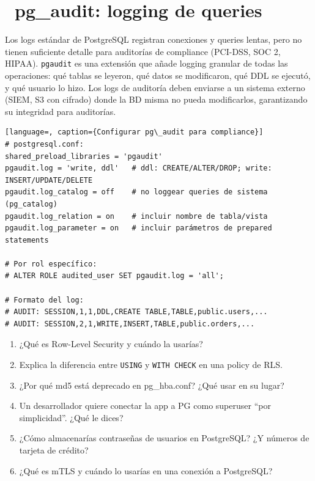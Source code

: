 \section[pg\_audit: logging de queries]{~pg\_audit: logging de queries}

Los logs estándar de PostgreSQL registran conexiones y queries lentas, pero no tienen suficiente detalle para auditorías de compliance (PCI-DSS, SOC 2, HIPAA).
\texttt{pgaudit} es una extensión que añade logging granular de todas las operaciones: qué tablas se leyeron, qué datos se modificaron, qué DDL se ejecutó, y qué usuario lo hizo.
Los logs de auditoría deben enviarse a un sistema externo (SIEM, S3 con cifrado) donde la BD misma no pueda modificarlos, garantizando su integridad para auditorías.

\begin{lstlisting}[language=, caption={Configurar pg\_audit para compliance}]
# postgresql.conf:
shared_preload_libraries = 'pgaudit'
pgaudit.log = 'write, ddl'   # ddl: CREATE/ALTER/DROP; write: INSERT/UPDATE/DELETE
pgaudit.log_catalog = off    # no loggear queries de sistema (pg_catalog)
pgaudit.log_relation = on    # incluir nombre de tabla/vista
pgaudit.log_parameter = on   # incluir parámetros de prepared statements

# Por rol específico:
# ALTER ROLE audited_user SET pgaudit.log = 'all';

# Formato del log:
# AUDIT: SESSION,1,1,DDL,CREATE TABLE,TABLE,public.users,...
# AUDIT: SESSION,2,1,WRITE,INSERT,TABLE,public.orders,...
\end{lstlisting}

\begin{entrevistabox}
\begin{enumerate}
  \item ¿Qué es Row-Level Security y cuándo la usarías?
  \item Explica la diferencia entre \texttt{USING} y \texttt{WITH CHECK} en una policy de RLS.
  \item ¿Por qué md5 está deprecado en pg\_hba.conf? ¿Qué usar en su lugar?
  \item Un desarrollador quiere conectar la app a PG como superuser ``por simplicidad''. ¿Qué le dices?
  \item ¿Cómo almacenarías contraseñas de usuarios en PostgreSQL? ¿Y números de tarjeta de crédito?
  \item ¿Qué es mTLS y cuándo lo usarías en una conexión a PostgreSQL?
\end{enumerate}
\end{entrevistabox}
